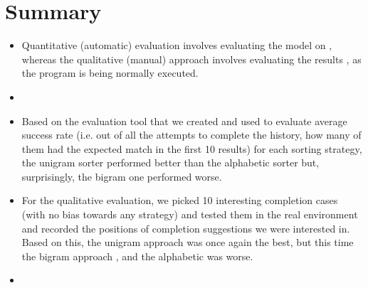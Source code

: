 \section{Summary}
\label{sec:Evaluation-Summary}
\begin{itemize}
    \item Quantitative (automatic) evaluation involves evaluating the model on , whereas the qualitative (manual) approach involves evaluating the results , as the program is being normally executed.
    \item {} 
    \item Based on the evaluation tool that we created and used to evaluate average success rate (i.e. out of all the attempts to complete the history, how many of them had the expected match in the first 10 results) for each sorting strategy, the unigram sorter performed better than the alphabetic sorter but, surprisingly, the bigram one performed worse.
    \item For the qualitative evaluation, we picked 10 interesting completion cases (with no bias towards any strategy) and tested them in the real environment and recorded the positions of completion suggestions we were interested in. Based on this, the unigram approach was once again the best, but this time the bigram approach , and the alphabetic was worse.
    \item {}  
\end{itemize}